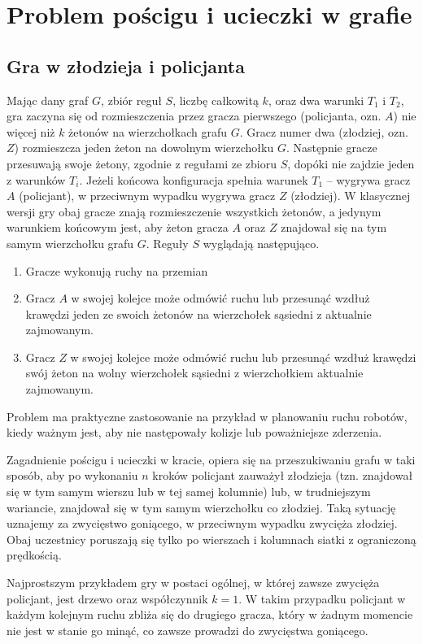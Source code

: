 \documentclass[brudnopis]{xmgr}
\theoremstyle{definition}
\begin{document}
\chapter{Problem pościgu i ucieczki w grafie}
\section{Gra w złodzieja i policjanta}
Mając dany graf $G$, zbiór reguł $S$, liczbę całkowitą $k$, oraz dwa warunki $T_1$ i $T_2$, gra zaczyna się od rozmieszczenia przez gracza pierwszego (policjanta, ozn. $A$) nie więcej niż $k$ żetonów na wierzchołkach grafu $G$. Gracz numer dwa (złodziej, ozn. $Z$) rozmieszcza jeden żeton na dowolnym wierzchołku $G$. Następnie gracze przesuwają swoje żetony, zgodnie z regułami ze zbioru $S$, dopóki nie zajdzie jeden z warunków $T_i$. Jeżeli końcowa konfiguracja spełnia warunek $T_1$ -- wygrywa gracz $A$ (policjant), w przeciwnym wypadku wygrywa gracz $Z$ (złodziej). W klasycznej wersji gry obaj gracze znają rozmieszczenie wszystkich żetonów, a jedynym warunkiem końcowym jest, aby żeton gracza $A$ oraz $Z$ znajdował się na tym samym wierzchołku grafu $G$.
Reguły $S$ wyglądają następująco.
\begin{enumerate}
  \item Gracze wykonują ruchy na przemian
  \item Gracz $A$ w swojej kolejce może odmówić ruchu lub przesunąć wzdłuż krawędzi jeden ze swoich żetonów na wierzchołek sąsiedni z aktualnie zajmowanym.
  \item Gracz $Z$ w swojej kolejce może odmówić ruchu lub przesunąć wzdłuż krawędzi swój żeton na wolny wierzchołek sąsiedni z wierzchołkiem aktualnie zajmowanym.
\end{enumerate}

Problem ma praktyczne zastosowanie na przykład w planowaniu ruchu robotów, kiedy ważnym jest, aby nie następowały kolizje lub poważniejsze zderzenia.

Zagadnienie pościgu i ucieczki w kracie, opiera się na przeszukiwaniu grafu  w taki sposób, aby po wykonaniu $n$ kroków policjant zauważył złodzieja (tzn. znajdował się w tym samym wierszu lub w tej samej kolumnie) lub, w trudniejszym wariancie, znajdował się w tym samym wierzchołku co złodziej. Taką sytuację uznajemy za zwycięstwo goniącego, w przeciwnym wypadku zwycięża złodziej. Obaj uczestnicy poruszają się tylko po wierszach i kolumnach siatki z ograniczoną prędkością.

Najprostszym przykładem gry w postaci ogólnej, w której zawsze zwycięża policjant, jest drzewo oraz współczynnik $k = 1$. W takim przypadku policjant w każdym kolejnym ruchu zbliża się do drugiego gracza, który w żadnym momencie nie jest w stanie go minąć, co zawsze prowadzi do zwycięstwa goniącego.
\end{document}

